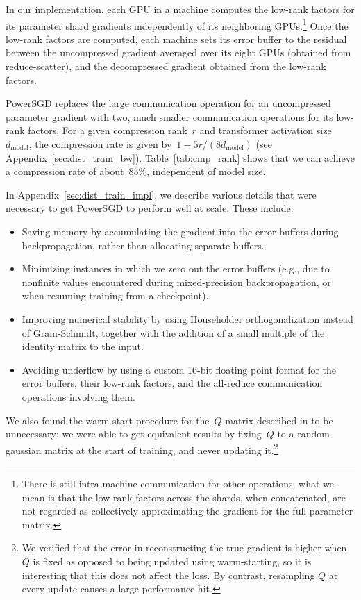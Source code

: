 In our implementation, each GPU in a machine computes the low-rank factors for its parameter shard gradients independently of its neighboring GPUs.\footnote{There is still intra-machine communication for other operations; what we mean is that the low-rank factors across the shards, when concatenated, are not regarded as collectively approximating the gradient for the full parameter matrix.} Once the low-rank factors are computed, each machine sets its error buffer to the residual between the uncompressed gradient averaged over its eight GPUs (obtained from reduce-scatter), and the decompressed gradient obtained from the low-rank factors.

PowerSGD replaces the large communication operation for an uncompressed parameter gradient with two, much smaller communication operations for its low-rank factors. For a given compression rank~$r$ and transformer activation size~$d_\mathrm{model}$, the compression rate is given by~$1 - 5 r / (8 d_\textrm{model})$ (see Appendix~\ref{sec:dist_train_bw}). Table~\ref{tab:cmp_rank} shows that we can achieve a compression rate of about~$85\%$, independent of model size.

In Appendix~\ref{sec:dist_train_impl}, we describe various details that were necessary to get PowerSGD to perform well at scale. These include:

\begin{itemize}
    \item Saving memory by accumulating the gradient into the error buffers during backpropagation, rather than allocating separate buffers.
    \item Minimizing instances in which we zero out the error buffers (e.g., due to nonfinite values encountered during mixed-precision backpropagation, or when resuming training from a checkpoint).
    \item Improving numerical stability by using Householder orthogonalization instead of Gram-Schmidt, together with the addition of a small multiple of the identity matrix to the input.
    \item Avoiding underflow by using a custom 16-bit floating point format for the error buffers, their low-rank factors, and the all-reduce communication operations involving them.
\end{itemize}

We also found the warm-start procedure for the~$Q$ matrix described in \citet{vogels2019powersgd} to be unnecessary: we were able to get equivalent results by fixing~$Q$ to a random gaussian matrix at the start of training, and never updating it.\footnote{We verified that the error in reconstructing the true gradient is higher when~$Q$ is fixed as opposed to being updated using warm-starting, so it is interesting that this does not affect the loss. By contrast, resampling $Q$ at every update causes a large performance hit.}


